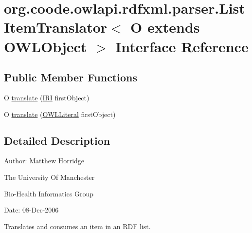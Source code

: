 \hypertarget{interfaceorg_1_1coode_1_1owlapi_1_1rdfxml_1_1parser_1_1_list_item_translator_3_01_o_01extends_01_o_w_l_object_01_4}{\section{org.\-coode.\-owlapi.\-rdfxml.\-parser.\-List\-Item\-Translator$<$ O extends O\-W\-L\-Object $>$ Interface Reference}
\label{interfaceorg_1_1coode_1_1owlapi_1_1rdfxml_1_1parser_1_1_list_item_translator_3_01_o_01extends_01_o_w_l_object_01_4}
}
\subsection*{Public Member Functions}
\begin{DoxyCompactItemize}
\item 
O \hyperlink{interfaceorg_1_1coode_1_1owlapi_1_1rdfxml_1_1parser_1_1_list_item_translator_3_01_o_01extends_01_o_w_l_object_01_4_ad6ea0aa220a2d7e1424c70597b0ab695}{translate} (\hyperlink{classorg_1_1semanticweb_1_1owlapi_1_1model_1_1_i_r_i}{I\-R\-I} first\-Object)
\item 
O \hyperlink{interfaceorg_1_1coode_1_1owlapi_1_1rdfxml_1_1parser_1_1_list_item_translator_3_01_o_01extends_01_o_w_l_object_01_4_a2505680898b7dc41f85fa0d84d1476f5}{translate} (\hyperlink{interfaceorg_1_1semanticweb_1_1owlapi_1_1model_1_1_o_w_l_literal}{O\-W\-L\-Literal} first\-Object)
\end{DoxyCompactItemize}


\subsection{Detailed Description}
Author\-: Matthew Horridge\par
 The University Of Manchester\par
 Bio-\/\-Health Informatics Group\par
 Date\-: 08-\/\-Dec-\/2006\par
\par
 

Translates and consumes an item in an R\-D\-F list. 

